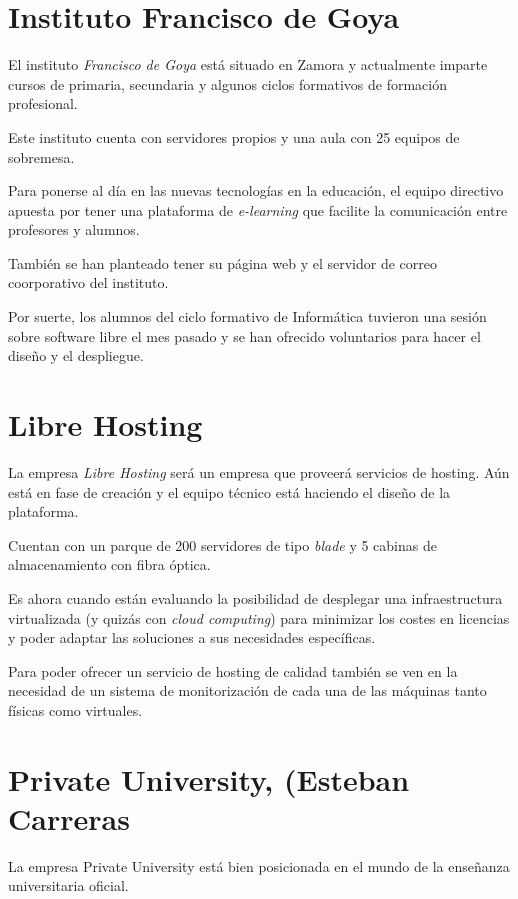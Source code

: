 \documentclass[a4paper]{article}
\begin{document}
  
  \section{Instituto Francisco de Goya}
  El instituto \textit{Francisco de Goya} está situado en Zamora y actualmente imparte cursos de primaria, secundaria y algunos
  ciclos formativos de formación profesional.
  
  Este instituto cuenta con servidores propios y una aula con 25 equipos de sobremesa.
  
  Para ponerse al día en las nuevas tecnologías en la educación, el equipo directivo apuesta por tener una plataforma de
  \textit{e-learning} que facilite la comunicación entre profesores y alumnos.
  
  También se han planteado tener su página web y el servidor de correo coorporativo del instituto.
  
  Por suerte, los alumnos del ciclo formativo de Informática tuvieron una sesión sobre software libre el mes pasado y se
  han ofrecido voluntarios para hacer el diseño y el despliegue.
  
  
  \section{Libre Hosting}
  La empresa \textit{Libre Hosting} será un empresa que proveerá servicios de hosting. Aún está en fase de creación y
  el equipo técnico está haciendo el diseño de la plataforma.
  
  Cuentan con un parque de 200 servidores de tipo \textit{blade} y 5 cabinas de almacenamiento con fibra óptica.
  
  Es ahora cuando están evaluando la posibilidad de desplegar una infraestructura virtualizada (y quizás con 
  \textit{cloud computing}) para minimizar los costes en licencias y poder adaptar las soluciones a sus necesidades
  específicas.
  
  Para poder ofrecer un servicio de hosting de calidad también se ven en la necesidad de un sistema de monitorización
  de cada una de las máquinas tanto físicas como virtuales.
  
  
  \section{Private University, (Esteban Carreras }

La empresa Private University está bien posicionada en el mundo de la
enseñanza universitaria oficial.
\end{document}
